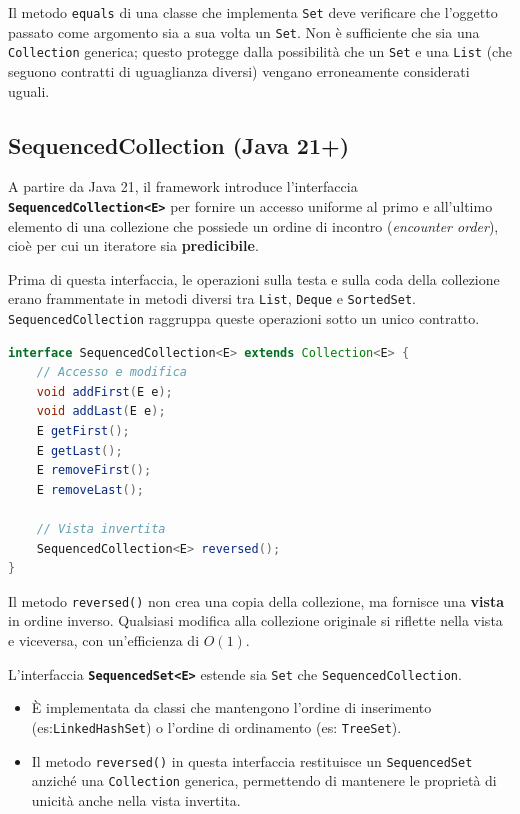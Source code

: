 \begin{warningbox}
Il metodo \texttt{equals} di una classe che implementa \texttt{Set} deve verificare che l'oggetto passato come argomento sia a sua volta un \texttt{Set}. Non è sufficiente che sia una \texttt{Collection} generica; questo protegge dalla possibilità che un \texttt{Set} e una \texttt{List} (che seguono contratti di uguaglianza diversi) vengano erroneamente considerati uguali.
\end{warningbox}

\subsection{SequencedCollection (Java 21+)}

A partire da Java 21, il framework introduce l'interfaccia \textbf{\texttt{SequencedCollection<E>}} per fornire un accesso uniforme al primo e all'ultimo elemento di una collezione che possiede un ordine di incontro (\textit{encounter order}), cioè per cui un iteratore sia \textbf{predicibile}.

Prima di questa interfaccia, le operazioni sulla testa e sulla coda della collezione erano frammentate in metodi diversi tra \texttt{List}, \texttt{Deque} e \texttt{SortedSet}. \texttt{SequencedCollection} raggruppa queste operazioni sotto un unico contratto.

\begin{lstlisting}[language=Java, caption={Metodi di SequencedCollection}]
interface SequencedCollection<E> extends Collection<E> {
    // Accesso e modifica
    void addFirst(E e);
    void addLast(E e);
    E getFirst();
    E getLast();
    E removeFirst();
    E removeLast();
    
    // Vista invertita
    SequencedCollection<E> reversed();
}
\end{lstlisting}

\begin{observation}
Il metodo \texttt{reversed()} non crea una copia della collezione, ma fornisce una \textbf{vista} in ordine inverso. Qualsiasi modifica alla collezione originale si riflette nella vista e viceversa, con un'efficienza di $O(1)$.
\end{observation}

L'interfaccia \textbf{\texttt{SequencedSet<E>}} estende sia \texttt{Set} che \texttt{SequencedCollection}. 
\begin{itemize}
    \item È implementata da classi che mantengono l'ordine di inserimento (es:\texttt{LinkedHashSet}) o l'ordine di ordinamento (es: \texttt{TreeSet}).
    \item Il metodo \texttt{reversed()} in questa interfaccia restituisce un \texttt{SequencedSet} anziché una \texttt{Collection} generica, permettendo di mantenere le proprietà di unicità anche nella vista invertita.
\end{itemize}

